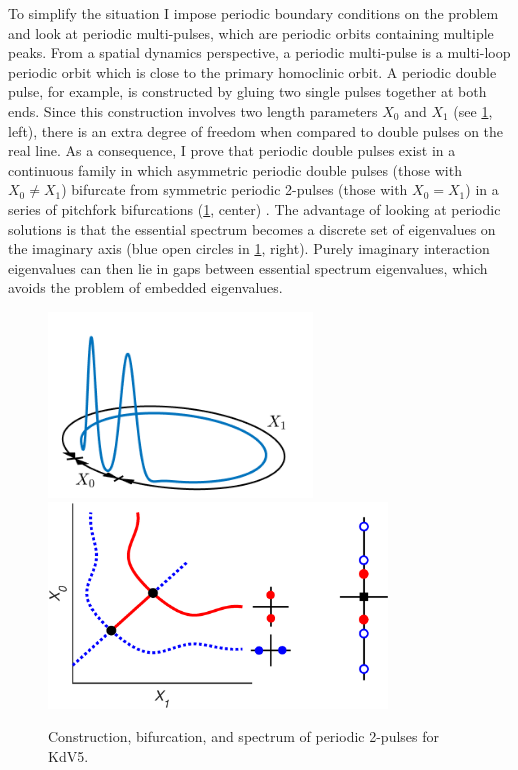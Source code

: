 \documentclass[12pt,reqno,oneside]{article}
\begin{document}
To simplify the situation I impose periodic boundary conditions on the problem and look at periodic multi-pulses, which are periodic orbits containing multiple peaks. From a spatial dynamics perspective, a periodic multi-pulse is a multi-loop periodic orbit which is close to the primary homoclinic orbit. A periodic double pulse, for example, is constructed by gluing two single pulses together at both ends. Since this construction involves two length parameters $X_0$ and $X_1$ (see \cref{fig:periodic}, left), there is an extra degree of freedom when compared to double pulses on the real line. As a consequence, I prove that periodic double pulses exist in a continuous family in which asymmetric periodic double pulses (those with $X_0 \neq X_1$) bifurcate from symmetric periodic 2-pulses (those with $X_0 = X_1$) in a series of pitchfork bifurcations (\cref{fig:periodic}, center) \cite{ParkerKdV}. The advantage of looking at periodic solutions is that the essential spectrum becomes a discrete set of eigenvalues on the imaginary axis (blue open circles in \cref{fig:periodic}, right). Purely imaginary interaction eigenvalues can then lie in gaps between essential spectrum eigenvalues, which avoids the problem of embedded eigenvalues. 
\begin{figure}[H]
    \begin{center}
    \includegraphics[width=7cm]{images/2pulse3d.png} \hspace{-1cm}
    \includegraphics[width=9cm]{images/2pitchforkcoloreig2.eps}
    \end{center}
    \caption{Construction, bifurcation, and spectrum of periodic 2-pulses for KdV5.}
    \label{fig:periodic}
\end{figure}
    
\end{document}
